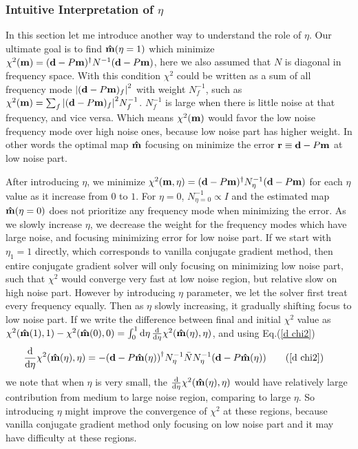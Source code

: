 \documentclass[11pt, letterpaper]{article}
\newcommand{\vbd}{\vb{d}}
\newcommand{\vbm}{\vb{m}}
\newcommand{\inv}[1]{#1^{-1}}
\newcommand{\hatm}{\vb{\hat{m}}}
\newcommand{\Nbar}{\bar{N}}
\newcommand{\Neta}{N_{\eta}}
\begin{document}
\subsubsection{Intuitive Interpretation of $\eta$}\label{intuitive interp}
In this section let me introduce another way to understand the role of $\eta$.
Our ultimate goal is to find $\hatm(\eta=1)$ which minimize 
$\chi^2(\vbm) = (\vbd - P\vbm)^{\dagger} \inv{N} (\vbd - P\vbm)$,
here we also assumed that $N$ is diagonal in frequency space.
With this condition $\chi^2$ could be written as a sum of all frequency mode 
$\qty|(\vbd-P\vbm)_f|^2$ with weight $\inv{N}_f$, such as
$\chi^2(\vbm) = \sum_f \qty|(\vbd-P\vbm)_f|^2 \inv{N}_f$.
$\inv{N}_f$ is large when there is little noise at that frequency,
and vice versa.
Which means $\chi^2(\vbm)$ would favor the low noise frequency mode over high 
noise ones, because low noise part has higher weight.
In other words the optimal map $\hatm$ focusing on minimize the error
$\vb{r} \equiv \vbd - P\vbm$ at low noise part.

After introducing $\eta$, we minimize
$\chi^2(\vbm,\eta)=(\vbd-P\vbm)^{\dagger} N_{\eta}^{-1} (\vbd - P\vbm)$
for each $\eta$ value as it increase from $0$ to $1$.
For $\eta=0$, $N^{-1}_{\eta=0} \propto I$ and the estimated map $\hatm(\eta=0)$
does not prioritize any frequency mode when minimizing the error.
As we slowly increase $\eta$, we decrease the weight for the frequency modes
which have large noise, and focusing minimizing error for low noise part.
If we start with $\eta_1=1$ directly, which corresponds to vanilla conjugate
gradient method, then entire conjugate gradient solver
will only focusing on minimizing low noise part, such that $\chi^2$ would
converge very fast at low noise region, but relative slow on high noise part.
However by introducing $\eta$ parameter, we let the solver first treat every
frequency equally.
Then as $\eta$ slowly increasing, it gradually shifting focus to low noise
part.
If we write the difference between final and initial $\chi^2$ value as
$\chi^2(\hatm(1),1) - \chi^2(\hatm(0),0) = \int_0^1 \dd{\eta}
\dv{\eta} \chi^2(\hatm(\eta),\eta)$,
and using Eq.(\ref{d chi2})
\begin{align}
\dv{\eta} \chi^2(\hatm(\eta), \eta) 
&= - \qty(\vbd - P\hatm(\eta))^{\dagger} \inv{\Neta} \Nbar \inv{\Neta} 
    (\vbd - P\hatm(\eta)) \tag{\ref{d chi2}}
\end{align}
we note that when $\eta$ is very small, 
the $\dv{\eta}\chi^2(\hatm(\eta),\eta)$ would have relatively large
contribution from medium to large noise region, comparing to large $\eta$.
So introducing $\eta$ might improve the convergence of $\chi^2$ at these
regions, because vanilla conjugate gradient method only focusing on low noise
part and it may have difficulty at these regions.
\end{document}
